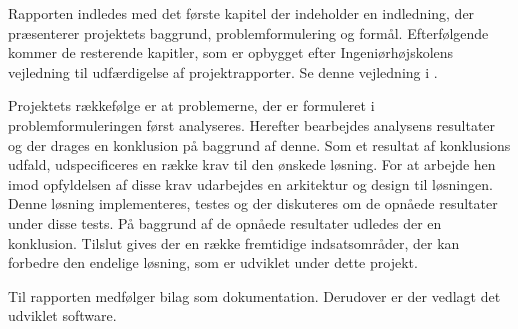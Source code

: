 Rapporten indledes med det første kapitel der indeholder en indledning, der præsenterer projektets baggrund, problemformulering og formål. Efterfølgende kommer de resterende kapitler, som er opbygget efter Ingeniørhøjskolens vejledning til udfærdigelse af projektrapporter. Se denne vejledning i . 

 
Projektets rækkefølge er at problemerne, der er formuleret i problemformuleringen først analyseres. Herefter bearbejdes analysens resultater og der drages en konklusion på baggrund af denne. Som et resultat af konklusions udfald, udspecificeres en række krav til den ønskede løsning. For at arbejde hen imod opfyldelsen af disse krav udarbejdes en arkitektur og design til løsningen. Denne løsning implementeres, testes og der diskuteres om de opnåede resultater under disse tests. På baggrund af de opnåede resultater udledes der en konklusion. Tilslut gives der en række fremtidige indsatsområder, der kan forbedre den endelige løsning, som er udviklet under dette projekt. 

Til rapporten medfølger bilag som dokumentation. Derudover er der vedlagt det udviklet software. 













